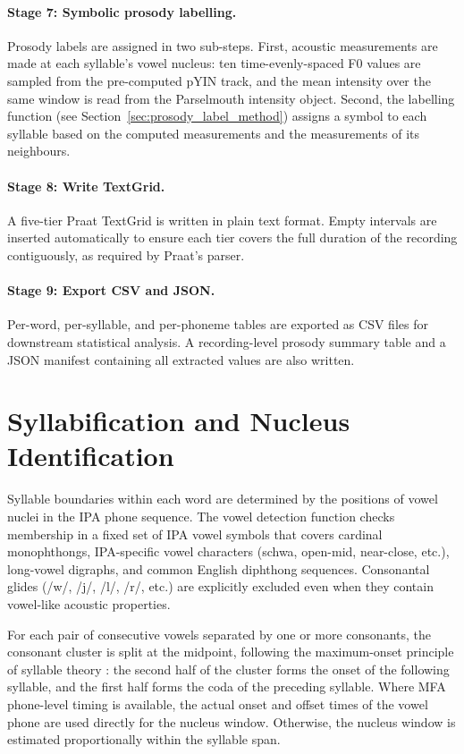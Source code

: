 \paragraph{Stage 7: Symbolic prosody labelling.}
Prosody labels are assigned in two sub-steps. First, acoustic measurements are
made at each syllable's vowel nucleus: ten time-evenly-spaced F0 values are
sampled from the pre-computed pYIN track, and the mean intensity over the same
window is read from the Parselmouth intensity object. Second, the labelling
function (see Section~\ref{sec:prosody_label_method}) assigns a symbol to each
syllable based on the computed measurements and the measurements of its
neighbours.

\paragraph{Stage 8: Write TextGrid.}
A five-tier Praat TextGrid is written in plain text format. Empty intervals are
inserted automatically to ensure each tier covers the full duration of the
recording contiguously, as required by Praat's parser.

\paragraph{Stage 9: Export CSV and JSON.}
Per-word, per-syllable, and per-phoneme tables are exported as CSV files for
downstream statistical analysis. A recording-level prosody summary table and a
JSON manifest containing all extracted values are also written.

\section{Syllabification and Nucleus Identification}
\label{sec:syllabification}

Syllable boundaries within each word are determined by the positions of vowel
nuclei in the IPA phone sequence. The vowel detection function checks membership
in a fixed set of IPA vowel symbols that covers cardinal monophthongs,
IPA-specific vowel characters (schwa, open-mid, near-close, etc.), long-vowel
digraphs, and common English diphthong sequences. Consonantal glides (/w/, /j/,
/l/, /r/, etc.) are explicitly excluded even when they contain vowel-like
acoustic properties.

For each pair of consecutive vowels separated by one or more consonants, the
consonant cluster is split at the midpoint, following the maximum-onset principle
of syllable theory \cite{kahn1976syllable}: the second half of the cluster forms
the onset of the following syllable, and the first half forms the coda of the
preceding syllable. Where MFA phone-level timing is available, the actual onset
and offset times of the vowel phone are used directly for the nucleus window.
Otherwise, the nucleus window is estimated proportionally within the syllable
span.

